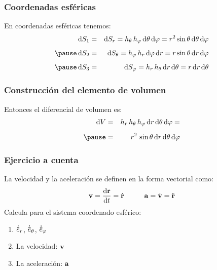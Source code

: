 \documentclass[12pt]{beamer}
\begin{document}
\begin{frame}
\frametitle{Coordenadas esféricas}
En coordenadas esféricas tenemos:
\pause
\begin{eqnarray*}
\dd{S_{1}} &=& \dd{S_{r}} = h_{\theta} \, h_{\varphi} \dd{\theta} \dd{\varphi} = r^{2} \sin \theta \dd{\theta} \dd{\varphi} \\[0.5em] \pause
\dd{S_{2}} &=& \dd{S_{\theta}} = h_{\varphi} \, h_{r} \dd{\varphi} \dd{r} = r \sin \theta \dd{r} \dd{\varphi} \\[0.5em] \pause
\dd{S_{3}} &=& \dd{S_{\varphi}} = h_{r} \, h_{\theta} \dd{r} \dd{\theta} = r \dd{r} \dd{\theta}
\end{eqnarray*}
\end{frame}
\begin{frame}
\frametitle{Construcción del elemento de volumen}
Entonces el diferencial de volumen es:
\pause
\begin{eqnarray*}
\dd{V} &=& h_{r} \, h_{\theta} \, h_{\varphi} \dd{r} \dd{\theta} \dd{\varphi} = \\[0.5em] \pause
&=& r^{2} \, \sin \theta \dd{r} \dd{\theta} \dd{\varphi}
\end{eqnarray*}
\end{frame}
\begin{frame}
\frametitle{Ejercicio a cuenta}
La velocidad y la aceleración se definen en la forma vectorial como:
\begin{align*}
\vb{v} = \dv{\vb{r}}{t} = \dot{\vb{r}} \hspace{1cm} \vb{a} = \dot{\vb{v}} = \ddot{\vb{r}}
\end{align*}
Calcula para el sistema coordenado esférico:
\begin{enumerate}[<+->]
\item $\dot{\vu{e}}_{r}$, $\dot{\vu{e}}_{\theta}$, $\dot{\vu{e}}_{\varphi}$ 
\item La velocidad: $\vb{v}$
\item La aceleración: $\vb{a}$
\end{enumerate}
\end{frame}
\end{document}
